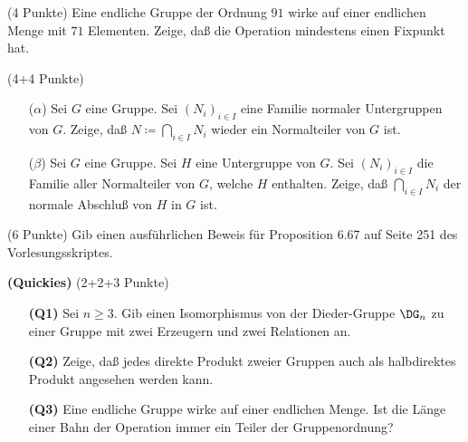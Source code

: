 \documentclass{algsheet}
\begin{document}
\begin{exercise}(4 Punkte)\newline
    Eine endliche Gruppe der Ordnung \(91\) wirke auf einer endlichen
    Menge mit \(71\) Elementen.
    Zeige, daß die Operation mindestens einen Fixpunkt hat.
\end{exercise}



\begin{exercise}(4+4 Punkte)\vspace{-1ex}
\begin{itemize}
    \item [($\alpha$)] Sei \(G\) eine Gruppe. Sei \((N_i)_{i \in I}\) eine Familie normaler
    Untergruppen von \(G\). Zeige, daß \(N \coloneqq \bigcap\limits_{i \in I}
    N_i\) wieder ein Normalteiler von \(G\) ist.
\item [($\beta$)]     Sei \(G\) eine Gruppe. Sei \(H\) eine Untergruppe von \(G\). Sei
    \((N_i)_{i \in I}\) die Familie aller Normalteiler von \(G\), welche
    \(H\) enthalten. Zeige, daß \(\bigcap\limits_{i \in I} N_i\) der
    normale Abschluß von \(H\) in \(G\) ist.
\end{itemize}
\end{exercise}

\begin{exercise}(6 Punkte)\newline
    Gib einen ausführlichen Beweis für Proposition 6.67 auf Seite 251 des Vorlesungsskriptes.
\end{exercise}

\begin{exercise}\textbf{(Quickies)} (2+2+3 Punkte)\vspace{-1ex}
\begin{itemize}
 \item [\textbf{(Q1)}]   Sei \(n \ge 3\).
    Gib einen Isomorphismus von der Dieder-Gruppe \(\DG_n\) zu einer Gruppe mit
    zwei Erzeugern und zwei Relationen an.
\item [\textbf{(Q2)}]     Zeige, daß jedes direkte Produkt zweier Gruppen auch als halbdirektes
    Produkt angesehen werden kann.
\item [\textbf{(Q3)}]  Eine endliche Gruppe wirke auf einer endlichen Menge. Ist die Länge einer
    Bahn der Operation immer ein Teiler der Gruppenordnung?
\end{itemize}
\end{exercise}
\end{document}
